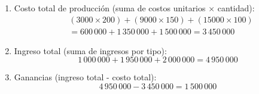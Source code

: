 \begin{prob}
\begin{myproof}
\begin{enumerate}[$(a)$]
\item Costo total de producción (suma de costos unitarios $\times$ cantidad):
\begin{align*}
&(3000 \times 200) + (9000 \times 150) + (15000 \times 100) \\
&= 600\,000 + 1\,350\,000 + 1\,500\,000 = \boxed{3\,450\,000}
\end{align*}

\item Ingreso total (suma de ingresos por tipo):
\[
1\,000\,000 + 1\,950\,000 + 2\,000\,000 = \boxed{4\,950\,000}
\]

\item Ganancias (ingreso total - costo total):
\[
4\,950\,000 - 3\,450\,000 = \boxed{1\,500\,000}
\]
\end{enumerate}
\end{myproof}
\end{prob}

